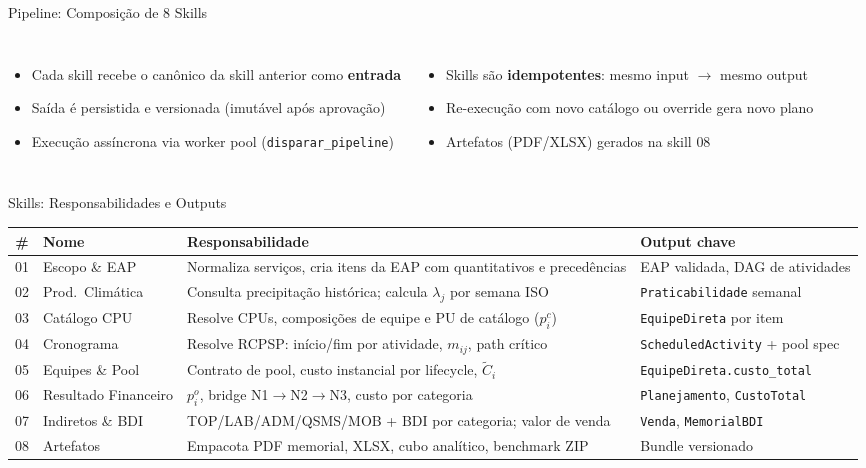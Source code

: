 \documentclass[aspectratio=169,10pt]{beamer}
\begin{document}
\begin{frame}{Pipeline: Composição de 8 Skills}
  \vspace{4pt}
  \begin{columns}[T]
    \begin{itemize}\scriptsize
      \item Cada skill recebe o canônico da skill anterior como \textbf{entrada}
      \item Saída é persistida e versionada (imutável após aprovação)
      \item Execução assíncrona via worker pool (\texttt{disparar\_pipeline})
    \end{itemize}
    \begin{itemize}\scriptsize
      \item Skills são \textbf{idempotentes}: mesmo input $\to$ mesmo output
      \item Re-execução com novo catálogo ou override gera novo plano
      \item Artefatos (PDF/XLSX) gerados na skill 08
    \end{itemize}
  \end{columns}
\end{frame}

\begin{frame}{Skills: Responsabilidades e Outputs}
  \renewcommand{\arraystretch}{1.2}
  \begin{tabularx}{\textwidth}{@{}c p{2.8cm} X p{3.0cm}@{}}
    \toprule
    \textbf{\#} & \textbf{Nome} & \textbf{Responsabilidade} & \textbf{Output chave} \\
    \midrule
    01 & Escopo \& EAP & Normaliza serviços, cria itens da EAP com quantitativos e precedências & EAP validada, DAG de atividades \\
    02 & Prod.\ Climática & Consulta precipitação histórica; calcula $\lambda_j$ por semana ISO & \texttt{Praticabilidade} semanal \\
    03 & Catálogo CPU & Resolve CPUs, composições de equipe e PU de catálogo ($p_i^c$) & \texttt{EquipeDireta} por item \\
    04 & Cronograma & Resolve RCPSP: início/fim por atividade, $m_{ij}$, path crítico & \texttt{ScheduledActivity} + pool spec \\
    05 & Equipes \& Pool & Contrato de pool, custo instancial por lifecycle, $\tilde{C}_i$ & \texttt{EquipeDireta.custo\_total} \\
    06 & Resultado Financeiro & $p_i^o$, bridge N1$\to$N2$\to$N3, custo por categoria & \texttt{Planejamento}, \texttt{CustoTotal} \\
    07 & Indiretos \& BDI & TOP/LAB/ADM/QSMS/MOB + BDI por categoria; valor de venda & \texttt{Venda}, \texttt{MemorialBDI} \\
    08 & Artefatos & Empacota PDF memorial, XLSX, cubo analítico, benchmark ZIP & Bundle versionado \\
    \bottomrule
  \end{tabularx}
\end{frame}
\end{document}
